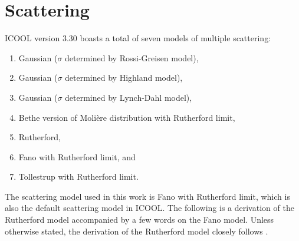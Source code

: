 \section{Scattering} \label{sec:icoolscattering}
ICOOL version 3.30 boasts a total of seven models of multiple scattering:
\begin{enumerate}
\item Gaussian ($\sigma$ determined by Rossi-Greisen model),
\item Gaussian ($\sigma$ determined by Highland model),
\item Gaussian ($\sigma$ determined by Lynch-Dahl model),
\item Bethe version of Moli\`{e}re distribution with Rutherford limit,
\item Rutherford,
\item Fano with Rutherford limit, and
\item Tollestrup with Rutherford limit.
\end{enumerate}
The scattering model used in this work is Fano with Rutherford limit, which is also the default scattering model in ICOOL. The following is a derivation of the Rutherford model accompanied by a few words on the Fano model. Unless otherwise stated, the derivation of the Rutherford model closely follows \cite{griffithsqm}.

